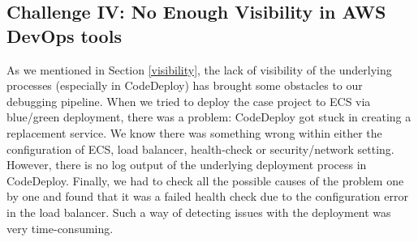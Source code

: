 \subsection{Challenge IV: No Enough Visibility in AWS DevOps tools}
As we mentioned in Section \ref{visibility}, the lack of visibility of the underlying processes (especially in CodeDeploy) has brought some obstacles to our debugging pipeline. When we tried to deploy the case project to ECS via blue/green deployment, there was a problem: CodeDeploy got stuck in creating a replacement service. We know there was something wrong within either the configuration of ECS, load balancer, health-check or security/network setting. However, there is no log output of the underlying deployment process in CodeDeploy. Finally, we had to check all the possible causes of the problem one by one and found that it was a failed health check due to the configuration error in the load balancer. Such a way of detecting issues with the deployment was very time-consuming.